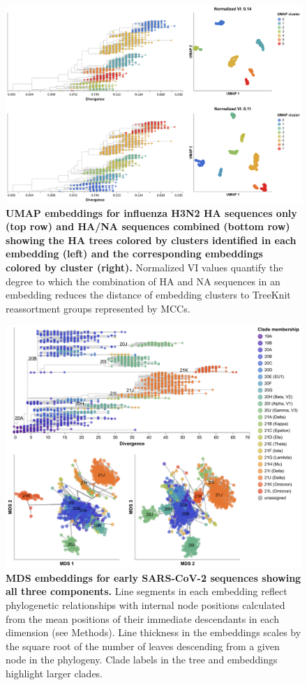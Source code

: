 \begin{figure}[!h]
\includegraphics[width=\columnwidth]{figures/flu-2016-2018-ha-na-umap-by-cluster.png}
\caption{{\bf UMAP embeddings for influenza H3N2 HA sequences only (top row) and HA/NA sequences combined (bottom row) showing the HA trees colored by clusters identified in each embedding (left) and the corresponding embeddings colored by cluster (right).}
  Normalized VI values quantify the degree to which the combination of HA and NA sequences in an embedding reduces the distance of embedding clusters to TreeKnit reassortment groups represented by MCCs.}\label{S_Fig_flu_ha_na_umap_embeddings}
\end{figure}

\begin{figure}[!h]
\includegraphics[width=\columnwidth]{figures/sarscov2-mds-by-Nextstrain_clade-clade.png}
\caption{{\bf MDS embeddings for early SARS-CoV-2 sequences showing all three components.}
  Line segments in each embedding reflect phylogenetic relationships with internal node positions calculated from the mean positions of their immediate descendants in each dimension (see Methods).
  Line thickness in the embeddings scales by the square root of the number of leaves descending from a given node in the phylogeny.
  Clade labels in the tree and embeddings highlight larger clades.}\label{S_Fig_sarscov2_early_mds}
\end{figure}

